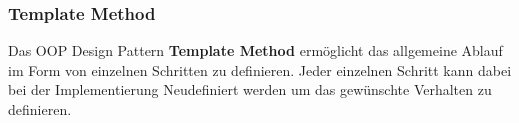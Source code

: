\subsubsection{Template Method}
Das OOP Design Pattern \textbf{Template Method} ermöglicht das allgemeine Ablauf im Form von einzelnen Schritten zu definieren.
Jeder einzelnen Schritt kann dabei bei der Implementierung Neudefiniert werden um das gewünschte Verhalten zu definieren.
